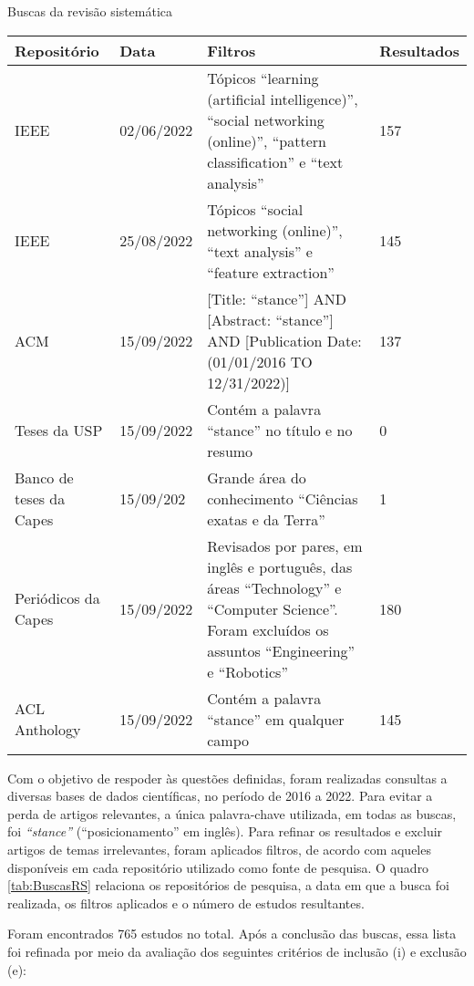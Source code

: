 \documentclass[
	12pt, oneside, a4paper, english, brazil
]{abntex2ppgsi}
\begin{document}
\begin{quadro}[H]
	\centering
	\caption{Buscas da revisão sistemática}
		\begin{tabular}{| p{0.8in} | p{0.8in} | p{2.5in} | p{0.8in} |} \hline

		Repositório	& Data & Filtros & Resultados \\ \hline
		IEEE	& 02/06/2022 & Tópicos ``learning (artificial intelligence)'', ``social networking (online)'', ``pattern classification'' e ``text analysis''  & 157 \\ \hline
		IEEE	& 25/08/2022 & Tópicos ``social networking (online)'', ``text analysis'' e ``feature extraction''  & 145 \\ \hline
		ACM	  & 15/09/2022 & [Title: ``stance''] AND [Abstract: ``stance''] AND [Publication Date: (01/01/2016 TO 12/31/2022)]  & 137 \\ \hline
		Teses da USP	& 15/09/2022 & Contém a palavra ``stance'' no título e no resumo  & 0 \\ \hline
		Banco de teses da Capes	& 15/09/202   & Grande área do conhecimento ``Ciências exatas e da Terra''  & 1 \\ \hline
        Periódicos da Capes	& 15/09/2022 & Revisados por pares, em inglês e português, das áreas ``Technology'' e ``Computer Science''. Foram excluídos os assuntos ``Engineering'' e ``Robotics''	& 180 \\ \hline
    ACL Anthology	& 15/09/2022 & Contém a palavra ``stance'' em qualquer campo & 145 \\ \hline
		\end{tabular}
	\label{tab:BuscasRS}
\end{quadro}

Com o objetivo de respoder às questões definidas, foram realizadas consultas a diversas bases de dados científicas, no período de 2016 a 2022. Para evitar a perda de artigos relevantes, a única palavra-chave utilizada, em todas as buscas, foi {\em ``stance''} (``posicionamento'' em inglês). Para refinar os resultados e excluir artigos de temas irrelevantes, foram aplicados filtros, de acordo com aqueles disponíveis em cada repositório utilizado como fonte de pesquisa. O quadro \ref{tab:BuscasRS} relaciona os repositórios de pesquisa, a data em que a busca foi realizada, os filtros aplicados e o número de estudos resultantes.

Foram encontrados 765 estudos no total. Após a conclusão das buscas, essa lista foi refinada por meio da avaliação dos seguintes critérios de inclusão (i) e exclusão (e):
\end{document}

